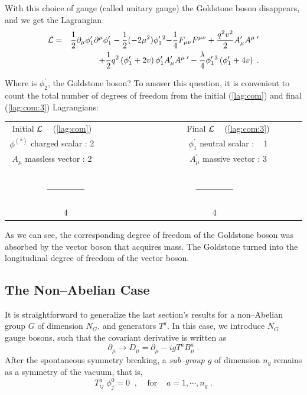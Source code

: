 \documentclass[12pt]{report}
\newcommand{\lag}{{\cal L}}
\newcommand{\del}{\partial}
\begin{document}
With this choice of gauge (called unitary gauge) the Goldstone boson
disappears, and we get the Lagrangian
\begin{eqnarray}
\lag & = & { \frac{1}{2} \del_\mu \phi_1^\prime \del^\mu \phi_1^\prime - 
\frac{1}{2} (-2 \mu^2) \phi_1^{\prime \; 2}}
{  - \frac{1}{4} F_{\mu\nu} F^{\mu\nu} + 
\frac{q^2 v^2}{2} A_\mu^\prime A^{\mu \; \prime} } 
\nonumber \\
&&  
+ \frac{1}{2} q^2 \left( \phi_1^\prime + 2 v \right) \phi_1^\prime
A_\mu^\prime A^{\mu \; \prime} 
- \frac{\lambda}{4} \phi_1^{\prime \; 3} \left( \phi_1^\prime + 4 v
\right) \; .
\label{lag:com:3}
\end{eqnarray}


Where is $\phi_2^\prime$, the Goldstone boson? To answer this 
question, it is convenient to count the total number of degrees of
freedom from the initial (\ref{lag:com}) and final (\ref{lag:com:3})
Lagrangians:

\vskip 1.2cm
\begin{center}
\begin{tabular}{cc}
{ Initial $\lag$ ~ (\ref{lag:com})}  ~~~~~~ & ~~~~~~ { Final $\lag$ ~
(\ref{lag:com:3})} \\[0.5cm]
$\phi^{(\ast)}$ charged scalar  : 2  ~~~~~~ & ~~~~~~
$\phi_1^\prime $ neutral scalar : ~ 1   \\
$A_\mu$ massless vector : 2  ~~~~~~ & ~~~~~~ 
$A_\mu^\prime$ massive vector : 3 \\[-0.3cm]
~~~~~~~~~~~~~~~~~~~~~~~~~~ \underline{~~~~~~~~~} & 
~~~~~~~~~~~~~~~~~~~~~~~~~~~~~~~~~~~~~~~ \underline{~~~~~~~~~} \\
~~~~~~~~~~~~~~~~~~~~~~~~~~ 4 & ~~~~~~~~~~~~~~~~~~~~~~~~~~~~~~~~~~~~~~~ 4
\end{tabular}
\end{center}
\vskip 0.5cm

As we can see, the corresponding degree of freedom of the Goldstone
boson was absorbed by the vector boson that acquires mass. The
Goldstone turned into the longitudinal degree of freedom of the vector
boson.


\newpage
\subsection{The Non--Abelian Case} \label{hig:nonabe} \indent

It is straightforward to generalize the last section's  results for a
non--Abelian group $G$ of dimension $N_G$, and generators $T^a$. In
this case, we introduce $N_G$ gauge bosons, such that the covariant
derivative is written as
\[
\del_\mu \longrightarrow D_\mu = \del_\mu - i g T^a B^a_\mu \; .
\]
After the spontaneous symmetry breaking, a {\it sub--group $g$} of
dimension $n_g$ remains as a symmetry of the vacuum, that is,
\[
T^a_{ij} \; \phi^0_j = 0 \;\; , \;\;\;\; \mbox{for} \;\;\;\; a =
1, \cdots , n_g \; .
\]
\end{document}
